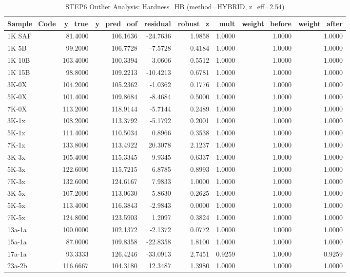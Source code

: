 \begin{table}
\caption{STEP6 Outlier Analysis: Hardness_HB (method=HYBRID, z_eff=2.54)}
\begin{tabular}{lrrrrrrr}
\toprule
Sample_Code & y_true & y_pred_oof & residual & robust_z & mult & weight_before & weight_after \\
\midrule
1K SAF & 81.4000 & 106.1636 & -24.7636 & 1.9858 & 1.0000 & 1.0000 & 1.0000 \\
1K 5B & 99.2000 & 106.7728 & -7.5728 & 0.4184 & 1.0000 & 1.0000 & 1.0000 \\
1K 10B & 103.4000 & 100.3394 & 3.0606 & 0.5512 & 1.0000 & 1.0000 & 1.0000 \\
1K 15B & 98.8000 & 109.2213 & -10.4213 & 0.6781 & 1.0000 & 1.0000 & 1.0000 \\
3K-0X & 104.2000 & 105.2362 & -1.0362 & 0.1776 & 1.0000 & 1.0000 & 1.0000 \\
5K-0X & 101.4000 & 109.8684 & -8.4684 & 0.5000 & 1.0000 & 1.0000 & 1.0000 \\
7K-0X & 113.2000 & 118.9144 & -5.7144 & 0.2489 & 1.0000 & 1.0000 & 1.0000 \\
3K-1x & 108.2000 & 113.3792 & -5.1792 & 0.2001 & 1.0000 & 1.0000 & 1.0000 \\
5K-1x & 111.4000 & 110.5034 & 0.8966 & 0.3538 & 1.0000 & 1.0000 & 1.0000 \\
7K-1x & 133.8000 & 113.4922 & 20.3078 & 2.1237 & 1.0000 & 1.0000 & 1.0000 \\
3K-3x & 105.4000 & 115.3345 & -9.9345 & 0.6337 & 1.0000 & 1.0000 & 1.0000 \\
5K-3x & 122.6000 & 115.7215 & 6.8785 & 0.8993 & 1.0000 & 1.0000 & 1.0000 \\
7K-3x & 132.6000 & 124.6167 & 7.9833 & 1.0000 & 1.0000 & 1.0000 & 1.0000 \\
3K-5x & 107.2000 & 113.0630 & -5.8630 & 0.2625 & 1.0000 & 1.0000 & 1.0000 \\
5K-5x & 113.4000 & 116.3843 & -2.9843 & 0.0000 & 1.0000 & 1.0000 & 1.0000 \\
7K-5x & 124.8000 & 123.5903 & 1.2097 & 0.3824 & 1.0000 & 1.0000 & 1.0000 \\
13a-1a & 100.0000 & 102.1372 & -2.1372 & 0.0772 & 1.0000 & 1.0000 & 1.0000 \\
15a-1a & 87.0000 & 109.8358 & -22.8358 & 1.8100 & 1.0000 & 1.0000 & 1.0000 \\
17a-1a & 93.3333 & 126.4246 & -33.0913 & 2.7451 & 0.9259 & 1.0000 & 0.9259 \\
23a-2b & 116.6667 & 104.3180 & 12.3487 & 1.3980 & 1.0000 & 1.0000 & 1.0000 \\

\end{tabular}
\end{table}

